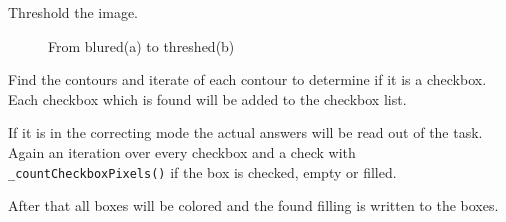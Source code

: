 Threshold the image.

\begin{figure}[H]
    \centering
    \qquad
    \caption{From blured(a) to threshed(b)}
\end{figure}

Find the contours and iterate of each contour to determine if it is a checkbox.
Each checkbox which is found will be added to the checkbox list.

If it is in the correcting mode the actual answers will be read out of the task.
Again an iteration over every checkbox and a check with \texttt{\_countCheckboxPixels()} if the box is checked, empty or filled.

After that all boxes will be colored and the found filling is written to the boxes.

